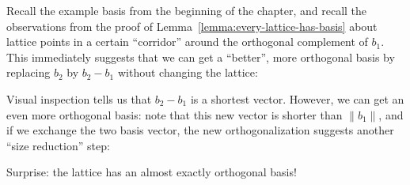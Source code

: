 Recall the example basis from the beginning of the chapter,
and recall the observations from the proof of Lemma~\ref{lemma:every-lattice-has-basis}
about lattice points in a certain ``corridor'' around the orthogonal complement of $b_1$.
This immediately suggests that we can get a ``better'', more orthogonal basis
by replacing $b_2$ by $b_2 - b_1$ without changing the lattice:
\begin{center}
\end{center}
Visual inspection tells us that $b_2 - b_1$ is a shortest vector.
However, we can get an even more orthogonal basis:
note that this new vector is shorter than $\|b_1\|$,
and if we exchange the two basis vector, the new orthogonalization suggests another ``size reduction'' step:
\begin{center}
\end{center}
Surprise: the lattice has an almost exactly orthogonal basis!

